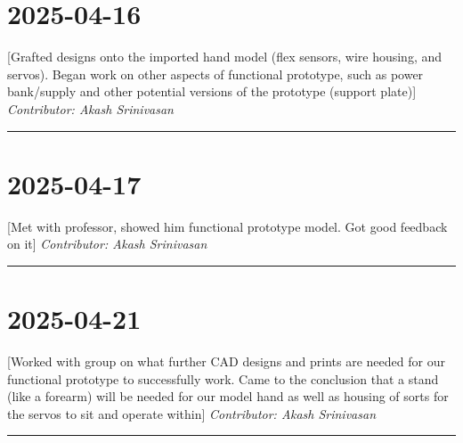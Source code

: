 \documentclass[12pt]{article}
\begin{document}
\section*{2025-04-16}
[Grafted designs onto the imported hand model (flex sensors, wire housing, and servos). Began work on other aspects of functional prototype, such as power bank/supply and other potential versions of the prototype (support plate)]
\vspace{1em}
\noindent\textit{Contributor: Akash Srinivasan}
\vspace{1em}
\hrule

\section*{2025-04-17}
[Met with professor, showed him functional prototype model. Got good feedback on it]
\vspace{1em}
\noindent\textit{Contributor: Akash Srinivasan}
\vspace{1em}
\hrule

\section*{2025-04-21}
[Worked with group on what further CAD designs and prints are needed for our functional prototype to successfully work. Came to the conclusion that a stand (like a forearm) will be needed for our model hand as well as housing of sorts for the servos to sit and operate within]
\vspace{1em}
\noindent\textit{Contributor: Akash Srinivasan}
\vspace{1em}
\hrule
\end{document}
